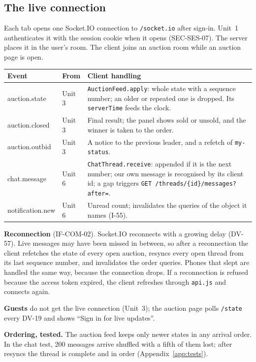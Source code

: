 \documentclass[11pt,a4paper]{article}
\newenvironment{dtable}[1]{\small\begin{longtable}{#1}}{\end{longtable}}
\begin{document}
\subsection{The live connection}
\label{sec:live}
Each tab opens one Socket.IO connection to \texttt{/socket.io} after sign-in. Unit~1 authenticates it with the session cookie when it opens (SEC-SES-07). The server places it in the user's room. The client joins an auction room while an auction page is open.
\begin{dtable}{@{}>{\ttfamily\raggedright\arraybackslash}p{3.3cm}>{\raggedright\arraybackslash}p{1.6cm}>{\raggedright\arraybackslash}p{10.3cm}@{}}
\toprule
\textnormal{\textbf{Event}} & \textbf{From} & \textbf{Client handling} \\ \midrule \endhead
auction.state & Unit 3 & \texttt{AuctionFeed.apply}: whole state with a sequence number; an older or repeated one is dropped. Its \texttt{serverTime} feeds the clock. \\
auction.closed & Unit 3 & Final result; the panel shows sold or unsold, and the winner is taken to the order. \\
auction.outbid & Unit 3 & A notice to the previous leader, and a refetch of \texttt{my-status}. \\
chat.message & Unit 6 & \texttt{ChatThread.receive}: appended if it is the next number; our own message is recognised by its client id; a gap triggers \texttt{GET /threads/\{id\}/messages?after=}. \\
notification.new & Unit 6 & Unread count; invalidates the queries of the object it names (I-55). \\
\bottomrule
\end{dtable}
\textbf{Reconnection} (IF-COM-02). Socket.IO reconnects with a growing delay (DV-57). Live messages may have been missed in between, so after a reconnection the client refetches the state of every open auction, resyncs every open thread from its last sequence number, and invalidates the order queries. Phones that slept are handled the same way, because the connection drops. If a reconnection is refused because the access token expired, the client refreshes through \texttt{api.js} and connects again.

\textbf{Guests} do not get the live connection (Unit~3); the auction page polls \texttt{/state} every DV-19 and shows ``Sign in for live updates''.

\textbf{Ordering, tested.} The auction feed keeps only newer states in any arrival order. In the chat test, 200 messages arrive shuffled with a fifth of them lost; after resyncs the thread is complete and in order (Appendix~\ref{app:tests}).
\end{document}
